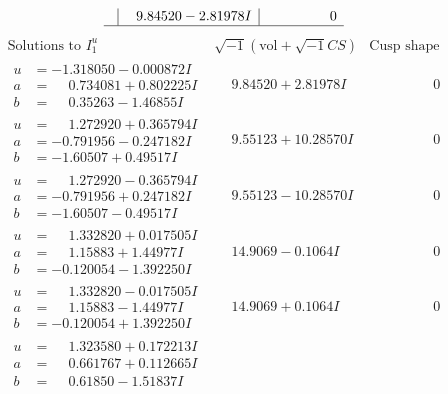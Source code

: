\documentclass[1p]{elsarticle_modified}
\theoremstyle{definition}
\newcommand{\I}{\sqrt{-1}}
\begin{document}
$$\begin{array}{c|c|c}
 & \phantom{-}9.84520 - 2.81978 I & \phantom{-0.000000 } 0\\
 \hline 
 \end{array}$$\newpage$$\begin{array}{c|c|c}  
\text{Solutions to }I^u_{1}& \I (\text{vol} + \sqrt{-1}CS) & \text{Cusp shape}\\
 \hline 
\begin{aligned}
u &= -1.318050 - 0.000872 I \\
a &= \phantom{-}0.734081 + 0.802225 I \\
b &= \phantom{-}0.35263 - 1.46855 I\end{aligned}
 & \phantom{-}9.84520 + 2.81978 I & \phantom{-0.000000 } 0 \\ \hline\begin{aligned}
u &= \phantom{-}1.272920 + 0.365794 I \\
a &= -0.791956 - 0.247182 I \\
b &= -1.60507 + 0.49517 I\end{aligned}
 & \phantom{-}9.55123 + 10.28570 I & \phantom{-0.000000 } 0 \\ \hline\begin{aligned}
u &= \phantom{-}1.272920 - 0.365794 I \\
a &= -0.791956 + 0.247182 I \\
b &= -1.60507 - 0.49517 I\end{aligned}
 & \phantom{-}9.55123 - 10.28570 I & \phantom{-0.000000 } 0 \\ \hline\begin{aligned}
u &= \phantom{-}1.332820 + 0.017505 I \\
a &= \phantom{-}1.15883 + 1.44977 I \\
b &= -0.120054 - 1.392250 I\end{aligned}
 & \phantom{-}14.9069 - 0.1064 I & \phantom{-0.000000 } 0 \\ \hline\begin{aligned}
u &= \phantom{-}1.332820 - 0.017505 I \\
a &= \phantom{-}1.15883 - 1.44977 I \\
b &= -0.120054 + 1.392250 I\end{aligned}
 & \phantom{-}14.9069 + 0.1064 I & \phantom{-0.000000 } 0 \\ \hline\begin{aligned}
u &= \phantom{-}1.323580 + 0.172213 I \\
a &= \phantom{-}0.661767 + 0.112665 I \\
b &= \phantom{-}0.61850 - 1.51837 I\end{aligned}

\end{array}$$
\end{document}
